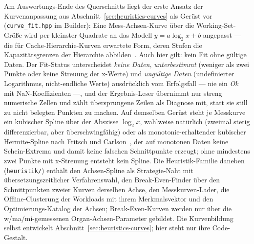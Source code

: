 \begin{nurlang}
Am Auswertungs-Ende des Querschnitts liegt der erste Ansatz der Kurvenanpassung aus
Abschnitt~\ref{sec:heuristics-curves} als Gerüst vor (\texttt{curve\_fit.hpp} im Builder): Eine
Mess-Achsen-Kurve über die Working-Set-Größe wird per kleinster Quadrate an das Modell
$y = a\log_2 x + b$ angepasst --- die für Cache-Hierarchie-Kurven erwartete Form, deren Stufen die
Kapazitätsgrenzen der Hierarchie abbilden~\cite{hill1989associativity}. Auch hier gilt: kein Fit ohne
gültige Daten. Der Fit-Status unterscheidet \emph{keine Daten}, \emph{unterbestimmt} (weniger als zwei
Punkte oder keine Streuung der x-Werte) und \emph{ungültige Daten} (undefinierter Logarithmus,
nicht-endliche Werte) ausdrücklich vom Erfolgsfall --- nie ein \emph{Ok} mit NaN-Koeffizienten ---, und
der Ergebnis-Leser übernimmt nur streng numerische Zellen und zählt übersprungene Zeilen als Diagnose mit,
statt sie still zu nicht belegten Punkten zu machen. Auf demselben Gerüst steht je Messkurve ein kubischer
Spline über der Abszisse $\log_2 x$, wahlweise natürlich (zweimal stetig differenzierbar, aber
überschwingfähig) oder als monotonie-erhaltender kubischer Hermite-Spline nach Fritsch und
Carlson~\cite{fritsch1980monotone}, der auf monotonen Daten keine Schein-Extrema und damit keine falschen
Schnittpunkte erzeugt; ohne mindestens zwei Punkte mit x-Streuung entsteht kein Spline. Die
Heuristik-Familie daneben (\texttt{heuristik/}) enthält den Achsen-Spline als Strategie-Naht mit
übersetzungszeitlicher Verfahrenswahl, den Break-Even-Finder über den Schnittpunkten zweier Kurven
derselben Achse, den Messkurven-Lader, die Offline-Clusterung der Workloads mit ihrem Merkmalsvektor und
den Optimierungs-Katalog der Achsen; Break-Even-Kurven werden nur über die w/ma/mi-gemessenen
Organ-Achsen-Parameter gebildet. Die Kurvenbildung selbst entwickelt
Abschnitt~\ref{sec:heuristics-curves}; hier steht nur ihre Code-Gestalt.
\end{nurlang}
